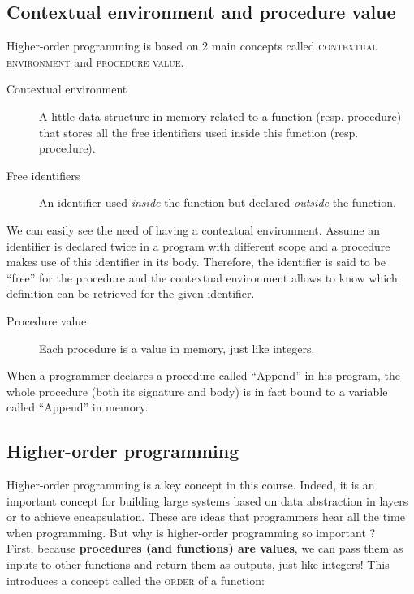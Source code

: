 \documentclass[11pt,a4paper,twoside,openright]{report}
\begin{document}
\subsection{Contextual environment and procedure value}

Higher-order programming is based on 2 main concepts called \textsc{contextual 
environment} and \textsc{procedure value}.

\begin{description}
 \item[Contextual environment] A little data structure in memory related to a 
function (resp. procedure) that stores all the free identifiers used inside 
this 
function (resp. procedure).
 \item[Free identifiers] An identifier used \textit{inside} the function but 
declared \textit{outside} the function.
\end{description}

We can easily see the need of having a contextual environment. Assume an 
identifier is declared twice in a program with different scope and a procedure 
makes use of this identifier in its body. Therefore, the identifier is said to 
be \enquote{free} for the procedure and the contextual environment allows to 
know which definition can be retrieved for the given identifier.

\begin{description}
 \item[Procedure value] Each procedure is a value in memory, just like 
integers.
\end{description}

When a programmer declares a procedure called \enquote{Append} in his program, 
the whole procedure (both its signature and body) is in fact bound to a 
variable 
called \enquote{Append} in memory.

\subsection{Higher-order programming}

Higher-order programming is a key concept in this course. Indeed, it is an 
important concept for building large systems based on data abstraction in 
layers 
or to achieve encapsulation. These are ideas that programmers hear all the time 
when programming. But why is higher-order programming so important ?\\

First, because \textbf{procedures (and functions) are values}, we can pass them 
as inputs to other functions and return them as outputs, just like integers! 
This introduces a concept called the \textsc{order} of a function:
\end{document}
